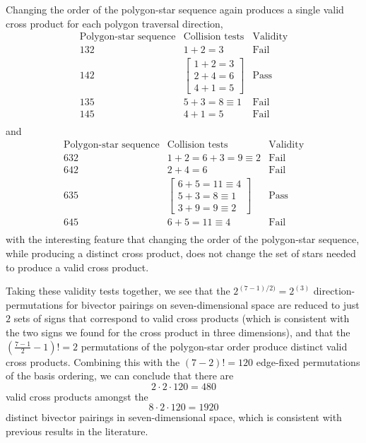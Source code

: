 \documentclass[11pt]{article}
\begin{document}
Changing the order of the polygon-star sequence again produces a single valid cross product for each polygon traversal direction,
\begin{equation}
\begin{array}{c|c|c}
\text{Polygon-star sequence} & \text{Collision tests} & \text{Validity} \\\hline \hline
1 3 2& 1+2 = 3 & \text{Fail} \\%
1 4 2 & \begin{bmatrix} 1+2=3 \\ 2+4=6 \\ 4+1 = 5 \end{bmatrix} &  \text{Pass}\\
1 3 5  & 5+3=8\equiv1 & \text{Fail} \\
1 4 5 & 4+1=5 & \text{Fail} \\
\end{array}
\end{equation}
and
\begin{equation}
\begin{array}{c|c|c}
\text{Polygon-star sequence} & \text{Collision tests} & \text{Validity} \\\hline \hline
6 3 2 & 1+2 = 6+3=9\equiv2 & \text{Fail} \\%
6 4 2 & 2+4=6 & \text{Fail}\\
6 3 5 &  \begin{bmatrix} 6+5=11\equiv4 \\ 5+3=8\equiv1 \\ 3+9=9\equiv2 \end{bmatrix} &  \text{Pass} \\
6 4 5 &6+5=11\equiv4 & \text{Fail} \\
\end{array}
\end{equation}
with the interesting feature that changing the order of the polygon-star sequence, while producing a distinct cross product, does not change the set of stars needed to produce a valid cross product.

Taking these validity tests together, we see that the $2^{(7-1)/2)} = 2^(3)$  direction-permutations for bivector pairings on seven-dimensional space are reduced to just $2$ sets of signs that correspond to valid cross products (which is consistent with the two signs we found for the cross product in three dimensions), and that the $(\frac{7-1}{2} -1)! = 2$ permutations of the polygon-star order produce distinct valid cross products. Combining this with the $(7-2)! = 120 $ edge-fixed permutations of the basis ordering, we can conclude that there are
\begin{equation}
2 \cdot 2 \cdot 120 = 480
\end{equation}
valid cross products amongst the 
\begin{equation}
8 \cdot 2 \cdot 120 = 1920
\end{equation}
distinct bivector pairings in seven-dimensional space, which is consistent with previous results in the literature.
\end{document}
